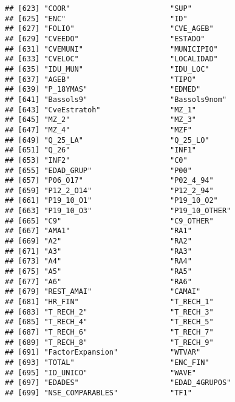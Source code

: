 \documentclass[
]{article}
\begin{document}
\begin{verbatim}
## [623] "COOR"                       "SUP"                       
## [625] "ENC"                        "ID"                        
## [627] "FOLIO"                      "CVE_AGEB"                  
## [629] "CVEEDO"                     "ESTADO"                    
## [631] "CVEMUNI"                    "MUNICIPIO"                 
## [633] "CVELOC"                     "LOCALIDAD"                 
## [635] "IDU_MUN"                    "IDU_LOC"                   
## [637] "AGEB"                       "TIPO"                      
## [639] "P_18YMAS"                   "EDMED"                     
## [641] "Bassols9"                   "Bassols9nom"               
## [643] "CveEstratoh"                "MZ_1"                      
## [645] "MZ_2"                       "MZ_3"                      
## [647] "MZ_4"                       "MZF"                       
## [649] "Q_25_LA"                    "Q_25_LO"                   
## [651] "Q_26"                       "INF1"                      
## [653] "INF2"                       "C0"                        
## [655] "EDAD_GRUP"                  "P00"                       
## [657] "P06_O17"                    "P02_4_94"                  
## [659] "P12_2_O14"                  "P12_2_94"                  
## [661] "P19_10_O1"                  "P19_10_O2"                 
## [663] "P19_10_O3"                  "P19_10_OTHER"              
## [665] "C9"                         "C9_OTHER"                  
## [667] "AMA1"                       "RA1"                       
## [669] "A2"                         "RA2"                       
## [671] "A3"                         "RA3"                       
## [673] "A4"                         "RA4"                       
## [675] "A5"                         "RA5"                       
## [677] "A6"                         "RA6"                       
## [679] "REST_AMAI"                  "CAMAI"                     
## [681] "HR_FIN"                     "T_RECH_1"                  
## [683] "T_RECH_2"                   "T_RECH_3"                  
## [685] "T_RECH_4"                   "T_RECH_5"                  
## [687] "T_RECH_6"                   "T_RECH_7"                  
## [689] "T_RECH_8"                   "T_RECH_9"                  
## [691] "FactorExpansion"            "WTVAR"                     
## [693] "TOTAL"                      "ENC_FIN"                   
## [695] "ID_UNICO"                   "WAVE"                      
## [697] "EDADES"                     "EDAD_4GRUPOS"              
## [699] "NSE_COMPARABLES"            "TF1"                       

\end{verbatim}
\end{document}
